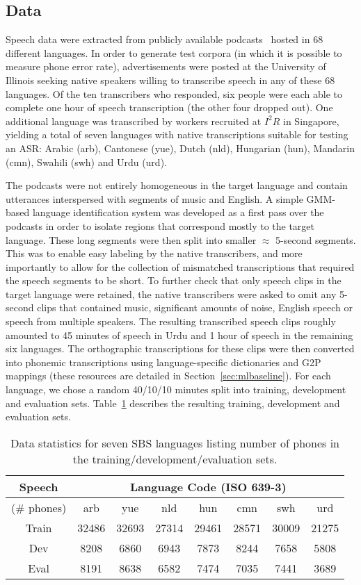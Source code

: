 \subsection{Data}
\label{sec:data}

Speech data were extracted from publicly available podcasts~\cite{SBS}
hosted in 68 different languages.  In order to generate test corpora
(in which it is possible to measure phone error rate), advertisements
were posted at the University of Illinois seeking native speakers
willing to transcribe speech in any of these 68 languages.  Of the ten
transcribers who responded, six people were each able to complete one
hour of speech transcription (the other four dropped out).  One
additional language was transcribed by workers recruited at $I^2R$ in
Singapore, yielding a total of seven languages with native
transcriptions suitable for testing an ASR: Arabic (arb), Cantonese
(yue), Dutch (nld), Hungarian (hun), Mandarin (cmn), Swahili (swh) and
Urdu (urd).

The podcasts were not entirely homogeneous in the target
language and contain utterances interspersed with segments of music
and English. A simple GMM-based language identification system was
developed as a first pass over the podcasts in order to isolate
regions that correspond mostly to the target language. These long
segments were then split into smaller $\approx$ 5-second
segments. This was to enable easy labeling by the native transcribers,
and more importantly to allow for the collection of mismatched
transcriptions that required the speech segments to be short. To
further check that only speech clips in the target language were
retained, the native transcribers were asked to omit any 5-second
clips that contained music, significant amounts of noise, English
speech or speech from multiple speakers. The resulting transcribed
speech clips roughly amounted to 45 minutes of speech in Urdu and 1
hour of speech in the remaining six languages. The orthographic
transcriptions for these clips were then converted into phonemic
transcriptions using language-specific dictionaries and G2P mappings
(these resources are detailed in Section~\ref{sec:mlbaseline}). For
each language, we chose a random 40/10/10 minutes split into training,
development and evaluation sets.  Table~\ref{tab:data} describes the
resulting training, development and evaluation sets.
\begin{table}[t]
\centering
\begin{tabular}{|c||c|c|c|c|c|c|c|}\hline
Speech  & \multicolumn{7}{|c|}{Language Code (ISO 639-3)}\\\hline
(\# phones) & arb & yue & nld & hun & cmn & swh & urd \\ \hline\hline
Train & 32486 & 32693 & 27314 & 29461 & 28571 & 30009 & 21275 \\
Dev & 8208 & 6860 & 6943 & 7873 & 8244 & 7658 & 5808 \\
Eval & 8191 & 8638 & 6582 & 7474 & 7035 & 7441 & 3689 \\\hline
\end{tabular}
\caption{Data statistics for seven SBS languages listing number of phones in the training/development/evaluation sets.}
\label{tab:data}
\end{table}
